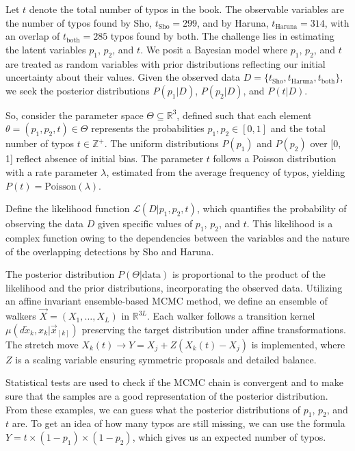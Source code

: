 \documentclass[12pt]{article}
\begin{document}
Let \( t \) denote the total number of typos in the book. The observable variables are the number of typos found by Sho, \( t_{\text{Sho}} = 299 \), and by Haruna, \( t_{\text{Haruna}} = 314 \), with an overlap of \( t_{\text{both}} = 285 \) typos found by both. The challenge lies in estimating the latent variables \( p_1 \), \( p_2 \), and \( t \). We posit a Bayesian model where \( p_1 \), \( p_2 \), and \( t \) are treated as random variables with prior distributions reflecting our initial uncertainty about their values. Given the observed data \( D = \{ t_{\text{Sho}}, t_{\text{Haruna}}, t_{\text{both}} \} \), we seek the posterior distributions \( P(p_1 | D) \), \( P(p_2 | D) \), and \( P(t | D) \).

So, consider the parameter space \(\Theta \subseteq \mathbb{R}^3\), defined such that each element \(\theta = (p_1, p_2, t) \in \Theta\) represents the probabilities \(p_1, p_2 \in [0, 1]\) and the total number of typos \(t \in \mathbb{Z}^+\). The uniform distributions \(P(p_1)\) and \(P(p_2)\) over [0, 1] reflect absence of initial bias. The parameter \(t\) follows a Poisson distribution with a rate parameter \(\lambda\), estimated from the average frequency of typos, yielding \(P(t) = \text{Poisson}(\lambda)\).

Define the likelihood function \( \mathcal{L}(D | p_1, p_2, t) \), which quantifies the probability of observing the data \( D \) given specific values of \( p_1 \), \( p_2 \), and \( t \). This likelihood is a complex function owing to the dependencies between the variables and the nature of the overlapping detections by Sho and Haruna.

The posterior distribution \(P(\Theta | \text{data})\) is proportional to the product of the likelihood and the prior distributions, incorporating the observed data. Utilizing an affine invariant ensemble-based MCMC method, we define an ensemble of walkers \(\vec{X} = (X_1, \ldots, X_L)\) in \(\mathbb{R}^{3L}\). Each walker follows a transition kernel \(\mu(d\tilde{x}_k, x_k | \vec{x}_{[k]})\) preserving the target distribution under affine transformations. The stretch move \(X_k(t) \rightarrow Y = X_j + Z(X_k(t) - X_j)\) is implemented, where \(Z\) is a scaling variable ensuring symmetric proposals and detailed balance.

Statistical tests are used to check if the MCMC chain is convergent and to make sure that the samples are a good representation of the posterior distribution. From these examples, we can guess what the posterior distributions of \(p_1\), \(p_2\), and \(t\) are. To get an idea of how many typos are still missing, we can use the formula \(Y = t \times (1 - p_1) \times (1 - p_2)\), which gives us an expected number of typos.
\end{document}
